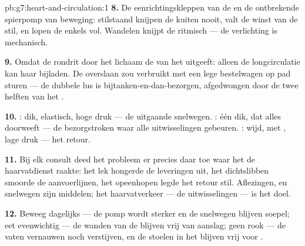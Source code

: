 \begin{solution}{pb:g7:heart-and-circulation:1}
\textbf{8.} De eenrichtingskleppen van de  en de ontbrekende
spierpomp van beweging: stilstaand knijpen de kuiten nooit, valt de
winst van de  stil, en lopen de enkels vol. Wandelen knijpt de
 ritmisch --- de verlichting is mechanisch.

\textbf{9.} Omdat de rondrit door het lichaam de  van het 
uitgeeft: alleen de longcirculatie kan haar bijladen. De 
overslaan zou verbruikt  met een lege bestelwagen op pad sturen ---
de dubbele lus is bijtanken-en-dan-bezorgen, afgedwongen door de twee
helften van het .

\textbf{10.} : dik, elastisch, hoge druk --- de uitgaande
snelwegen. : één  dik, dat alles doorweeft --- de
bezorgstroken waar alle uitwisselingen gebeuren. : wijd, met
, lage druk --- het retour.

\textbf{11.} Bij elk consult deed het probleem er precies daar toe waar
het de haarvatdienst raakte: het lek hongerde de leveringen uit, het
dichtslibben smoorde de aanvoerlijnen, het opeenhopen legde het retour
stil. Aflezingen,  en snelwegen zijn middelen; het
haarvatverkeer --- de uitwisselingen --- is het doel.

\textbf{12.} Beweeg dagelijks --- de pomp wordt sterker en de snelwegen
blijven soepel; eet evenwichtig --- de wanden van de  blijven
vrij van aanslag; geen rook --- de vaten vernauwen noch verstijven, en de
stoelen in het  blijven vrij voor .
\end{solution}

